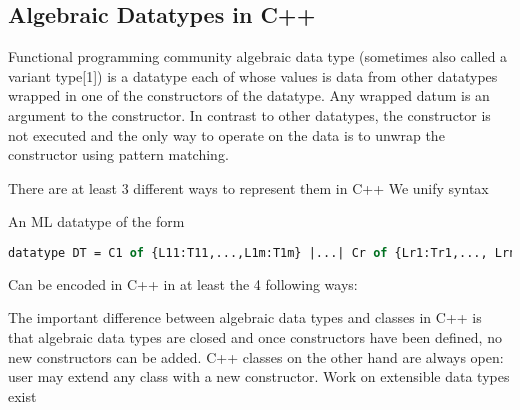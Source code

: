 \documentclass[preprint]{sigplanconf}
\begin{document}
\subsection{Algebraic Datatypes in C++}

%

Functional programming community 
algebraic data type (sometimes also called a variant type[1]) is a datatype each 
of whose values is data from other datatypes wrapped in one of the constructors 
of the datatype. Any wrapped datum is an argument to the constructor. In 
contrast to other datatypes, the constructor is not executed and the only way to 
operate on the data is to unwrap the constructor using pattern matching.

There are at least 3 different ways to represent them in C++
We unify syntax 

An ML datatype of the form 

\begin{lstlisting}[language=ML]
datatype DT = C1 of {L11:T11,...,L1m:T1m} |...| Cr of {Lr1:Tr1,..., Lrn:Trn}
\end{lstlisting}

Can be encoded in C++ in at least the 4 following ways:

The important difference between algebraic data types and classes in C++ is that
algebraic data types are closed and once constructors have been defined, no new
constructors can be added. C++ classes on the other hand are always open: user 
may extend any class with a new constructor. Work on extensible data types 
exist\cite{ExtensibleDatatypes,LohHinze2006}

%
\end{document}
